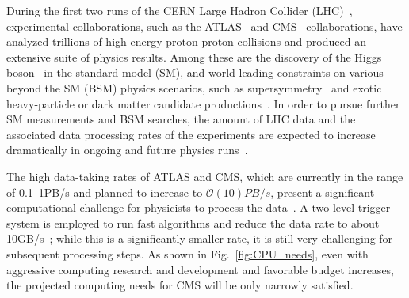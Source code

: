During the first two runs of the CERN Large Hadron Collider (LHC)~\cite{Evans:2008zzb}, experimental collaborations, such as the ATLAS~\cite{ATLAS:2008xda} and CMS~\cite{CMS:2008xjf} collaborations, have analyzed trillions of high energy proton-proton collisions and produced an extensive suite of physics results. Among these are the discovery of the Higgs boson~\cite{ATLAS:2012yve,CMS:2012qbp} in the standard model (SM),  and world-leading constraints on various beyond the SM (BSM) physics scenarios, such as supersymmetry~\cite{ATLAS:2021hza, ATLAS:2021twp, ATLAS:2021kxv, CMS:2020fia, CMS:2021edw, CMS:2022vpy} and exotic heavy-particle or dark matter candidate productions~\cite{ATLAS:2022ozf, ATLAS:2021wob, CMS:2022usq, CMS:2022qej}. In order to pursue further SM measurements and BSM searches, the amount of LHC data and the associated data processing rates of the experiments are expected to increase dramatically in ongoing and future physics runs~\cite{Bruning:2015dfu}.

The high data-taking rates of ATLAS and CMS, which are currently in the range of 0.1--1\unit{PB/s} and planned to increase to $\mathcal{O}(10)\unit{PB/s}$, present a significant computational challenge for physicists to process the data~\cite{Zabi:2020gjd,2137107}. 
A two-level trigger system is employed to run fast algorithms and reduce the data rate to about 10\unit{GB/s}~\cite{ATLAS:2020esi, CMS:2016ngn}; while this is a significantly smaller rate, it is still very challenging for subsequent processing steps. As shown in Fig.~\ref{fig:CPU_needs}, even with aggressive computing research and development and favorable budget increases, the projected computing needs for CMS will be only narrowly satisfied.

